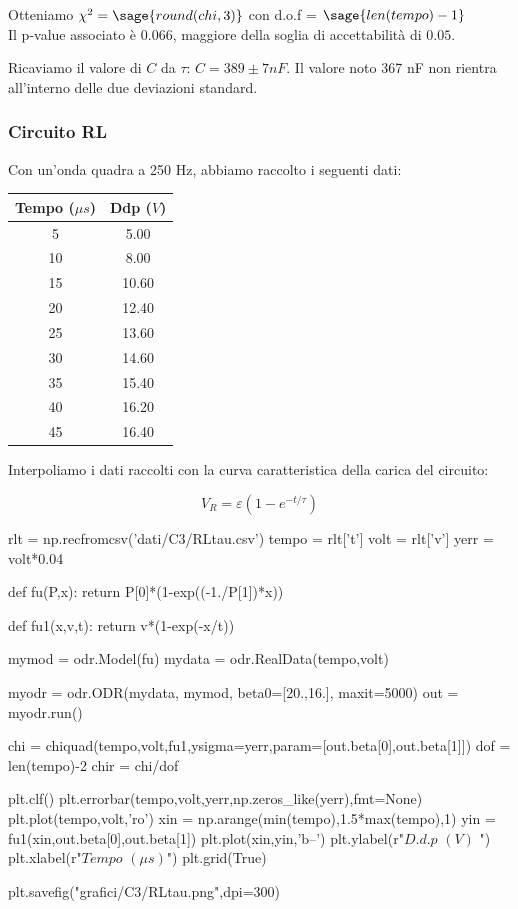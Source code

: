 Otteniamo $\chi^2 = \sage{round(chi,3)}$ con d.o.f = $\sage{len(tempo)-1}$\\
Il p-value associato è $0.066$, maggiore della soglia di accettabilità di $0.05$.

Ricaviamo il valore di $C$ da $\tau$: $C= 389 \pm 7 nF $. Il valore noto 367 nF non rientra all'interno delle due deviazioni standard. 

\subsubsection{Circuito RL}
Con un'onda quadra a 250 Hz, abbiamo raccolto i seguenti dati:

\begin{center}
\begin{tabular}{*{2}{c}}
Tempo ($\mu s$) & Ddp ($V$) \\
\midrule
5 & 5.00 \\
10 & 8.00 \\
15 & 10.60 \\
20 & 12.40 \\
25 & 13.60 \\
30 & 14.60 \\
35 & 15.40 \\
40 & 16.20 \\
45 & 16.40 \\
\end{tabular}
\end{center}
Interpoliamo i dati raccolti con la curva caratteristica della carica del circuito:

$$V_R = \varepsilon \left( 1-e^{-t/\tau} \right)$$

\begin{sagesilent}
 
rlt = np.recfromcsv('dati/C3/RLtau.csv')
tempo = rlt['t']
volt = rlt['v']
yerr = volt*0.04

def fu(P,x):
    return P[0]*(1-exp((-1./P[1])*x))
    
def fu1(x,v,t):
    return v*(1-exp(-x/t))
    
mymod = odr.Model(fu)
mydata = odr.RealData(tempo,volt)

myodr = odr.ODR(mydata, mymod, beta0=[20.,16.], maxit=5000)
out = myodr.run()

chi = chiquad(tempo,volt,fu1,ysigma=yerr,param=[out.beta[0],out.beta[1]])
dof = len(tempo)-2
chir = chi/dof

plt.clf()
plt.errorbar(tempo,volt,yerr,np.zeros_like(yerr),fmt=None)
plt.plot(tempo,volt,'ro')
xin = np.arange(min(tempo),1.5*max(tempo),1)
yin = fu1(xin,out.beta[0],out.beta[1])
plt.plot(xin,yin,'b--')
plt.ylabel(r"$D.d.p$ $(V)$ ")
plt.xlabel(r"$Tempo$ $(\mu s)$")
plt.grid(True)

plt.savefig("grafici/C3/RLtau.png",dpi=300)

\end{sagesilent}




